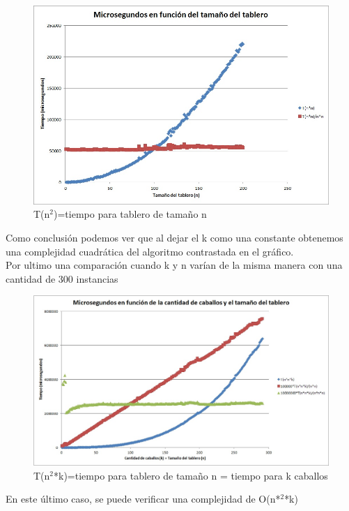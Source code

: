 \begin{figure}[H]
                \includegraphics[scale=1]{Imagenes/Ej2/kFijo}
                \caption{T(n$^{2}$)=tiempo para tablero de tamaño n}
                \label{fig:exp2}
\end{figure} 
Como conclusión podemos ver que al dejar el k como una constante obtenemos una complejidad cuadrática del algoritmo contrastada en el gráfico.\\


Por ultimo una comparación cuando k y n varían de la misma manera con una cantidad de 300 instancias

\begin{figure}[H]
                \includegraphics[scale=0.8]{Imagenes/Ej2/nkIguales}
                \caption{T(n$^{2}$*k)=tiempo para tablero de tamaño n = tiempo para k caballos}
                \label{fig:exp2}
\end{figure} 

En este último caso, se puede verificar una complejidad de O(n*$^{2}$*k)





